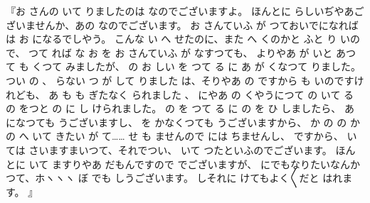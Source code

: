 『お
さんの
いて
りましたのは
なのでございますよ。
ほんとに
らしいぢやあございませんか、あの
なのでございます。
お
さんていふ
が
つておいでになれば
は
お
になるでしやう。
こんな
い
へ
せたのに、また
へ
くのかと
ふと
り
いので、
つて
れば
な
お
を
お
さんていふ
が
なすつても、
よりやあ
が
いと
あつて
も
くつて
みましたが、
の
お
しい
を
つて
る
に
あ
が
くなつて
りました。
つい
の
、
らない
つ
が
して
りました
は、そりやあ
の
ですから
も
いのですけれども、
あ
も
も
ぎたなく
られました
、
にやあ
の
くやうにつて
の
いて
る
の
をつと
の
に
し
けられました。
の
を
つて
る
に
の
を
ひ
しましたら、
あ
になつても
うございますし、
を
かなくつても
うございますから、
か
の
の
かの
へ
いて
きたい
が
て……
せ
も
ませんので
には
ちませんし、
ですから、
いては
さいますまいつて、それでつい、
いて
つたといふのでございます。
ほんとに
いて
ますりやあ
だもんですので
でございますが、
にでもなりたいなんかつて、ホヽヽヽ
ぼ
でも
しうございます。
しそれに
けてもよく〳〵だと
はれます。
』

